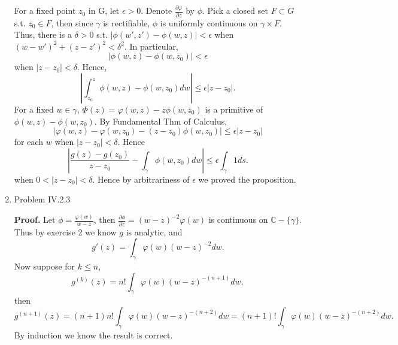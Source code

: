 \documentclass{article}%
\begin{document}
\begin{enumerate}
For a fixed point $z_0 $ in G, let $\epsilon > 0$. Denote $\frac{\partial \varphi}{\partial z}$ by $\phi$. Pick a closed set $F\subset G$ s.t. $z_0\in F $, then since $\gamma $ is rectifiable, $\phi$ is uniformly continuous on $\gamma\times F$. Thus, there is a $\delta > 0$ s.t. $|\phi(w', z')-\phi(w, z)| < \epsilon$ when $(w-w')^2+(z-z')^2<\delta^2 $. In particular, 
$$
|\phi(w, z)-\phi(w, z_0)| < \epsilon
$$
when $|z-z_0| < \delta$. Hence,
$$
|\int_{z_0}^{z}\phi(w, z)-\phi(w, z_0)dw| \le \epsilon|z-z_0|.
$$
For a fixed $w\in\gamma$, $\Phi(z) = \varphi(w, z)-z\phi(w, z_0)$ is a primitive of $\phi(w, z)-\phi(w, z_0)$. By Fundamental Thm of Calculus, 
$$
|\varphi(w, z)-\varphi(w, z_0)-(z-z_0)\phi(w, z_0)|\le \epsilon |z-z_0|
$$
for each $w$ when $|z-z_0|< \delta$. Hence
$$
|\frac{g(z)-g(z_0)}{z-z_0}-\int_{\gamma}\phi(w, z_0)dw|\le \epsilon\int_{\gamma}1ds.
$$
when $0 < |z-z_0| < \delta $. Hence by arbitrariness of $\epsilon$ we proved the proposition.

\item Problem IV.2.3

\textbf{Proof.} Let $\phi = \frac{\varphi(w)}{w-z}$, then $\frac{\partial \phi}{\partial z} = (w-z)^{-2}\varphi(w) $ is continuous on $\mathbb{C}-\{\gamma\}$. Thus by exercise 2 we know $g$ is analytic, and
$$
g'(z) = \int_{\gamma}\varphi(w)(w-z)^{-2}dw.
$$
Now suppose for $k \le n$,
$$
g^{(k)}(z) = n!\int_{\gamma}\varphi(w)(w-z)^{-(n+1)}dw,
$$
then
$$
g^{(n+1)}(z) = (n+1)n!\int_{\gamma}\varphi(w)(w-z)^{-(n+2)}dw = (n+1)!\int_{\gamma}\varphi(w)(w-z)^{-(n+2)}dw.
$$
By induction we know the result is correct.

\end{enumerate}
\end{document}
